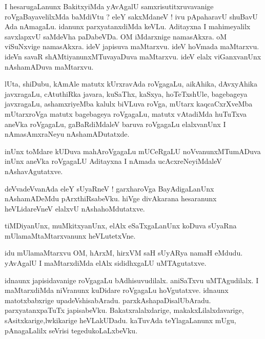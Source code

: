 \documentclass{article}
\begin{document}
\begin{mng}%
I hesarugaLanunx BakitxyiMda yAvAgalU samxrisutitxruvavanige roVgaBayavelilxMda baMdiVtu ? eleY 
sakxMdaneV ! ivu pApaharavU shuBavU Ada nAmagaLu. idanunx parxyatanxdiMda keVLu. Aditayxna I 
mahimeyalilx savxlapxvU saMdeVha paDabeVDa. OM iMdarxnige namasAkxra. oM viSuNxvige namasAkxra. 
ideV japisuva maMtarxvu. ideV hoVmada maMtarxvu. ideVn savaR shAMtiyanunxMTuvayaDuva maMtarxvu. 
ideV elalx viGanxvanUnx nAshamADuva maMtarxvu.
\end{mng}

\begin{mng}%
lUta, shiDubu, kAmAle matutx kUrxravAda roVgagaLu, aikAhika, dAvxyAhika javxragaLu, cAtuthiRka 
javara, kuSaThx, kaSxya, hoTeTxshUle, bagebageya javxragaLu, ashamxriyeMba kalulx biVLuva roVga, 
mUtarx kaqcaCxrXveMba mUtarxroVga matutx bagebageya roVgagaLu, matutx vAtadiMda huTuTxva aneVka 
roVgagaLu, gaBaRdiMdaleV baruva roVgagaLu elalxvanUnx I nAmasAmxraNeyu nAshamADutatxde.
\end{mng}

\begin{mng}%
inUnx toMdare kUDuva mahAroVgagaLu mUCeRgaLU noVvanunxMTumADuva inUnx aneVka roVgagaLU Aditayxna I 
nAmada ucAcxreNeyiMdaleV nAshavAgutatxve.
\end{mng}

\begin{mng}%
deVvadeVvanAda eleY sUyaRneV ! garxharoVga BayAdigaLanUnx nAshamADeMdu pArxthiRsabeVku. hiVge 
divAkarana hesaranunx heVLidareVneV elalxvU nAshahoMdutatxve.
\end{mng}

\begin{mng}%
tiMDiyanUnx, muMkitxyanUnx, elAlx eSaTxgaLanUnx koDuva sUyaRna mUlamaMtaMtarxvanunx heVLutetxVne.
\end{mng}

\begin{mng}%
idu mUlamaMtarxvu OM, hArxM, hirxVM saH sUyARya namaH  eMdudu. yAvAgalU I maMtarxdiMda elAlx 
sididhxgaLU uMTAgutatxve.
\end{mng}

\begin{mng}%
idnaunx japisidavanige roVgagaLu bAdhisuvudilalx. aniSaTxvu uMTAgudilalx. I maMtarxdiMda niVranunx 
kuDidare roVgagaLu hoVgutatxve. idnaunx matotxbabxrige upadeVshisabAradu. 
parxkAshapaDisalUbAradu. parxyatanxpaTuTx japisabeVku. Bakatxralalxdarige, makakxLilalxdavarige, 
sAsitxkarige,lwkikarige heVLakUDadu. kaTuvAda teYlagaLanunx mUgu, pAnagaLalilx seVrisi 
tegedukoLaLxbeVku.
\end{mng}
\end{document}

